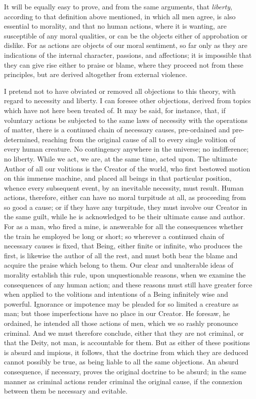 \documentclass[]{article}
\begin{document}
\begin{sectionbody}
\humeparagraph  It will be equally easy to prove, and from the same arguments, that \emph{liberty}, according to that definition above mentioned, in which all men agree, is also essential to morality, and that no human actions, where it is wanting, are susceptible of any moral qualities, or can be the objects either of approbation or dislike. For as actions are objects of our moral sentiment, so far only as they are indications of the internal character, passions, and affections; it is impossible that they can give rise either to praise or blame, where they proceed not from these principles, but are derived altogether from external violence.

\humeparagraph  I pretend not to have obviated or removed all objections to this theory, with regard to necessity and liberty. I can foresee other objections, derived from topics which have not here been treated of. It may be said, for instance, that, if voluntary actions be subjected to the same laws of necessity with the operations of matter, there is a continued chain of necessary causes, pre-ordained and pre-determined, reaching from the original cause of all to every single volition of every human creature. No contingency anywhere in the universe; no indifference; no liberty. While we act, we are, at the same time, acted upon. The ultimate Author of all our volitions is the Creator of the world, who first bestowed motion on this immense machine, and placed all beings in that particular position, whence every subsequent event, by an inevitable necessity, must result. Human actions, therefore, either can have no moral turpitude at all, as proceeding from so good a cause; or if they have any turpitude, they must involve our Creator in the same guilt, while he is acknowledged to be their ultimate cause and author. For as a man, who fired a mine, is answerable for all the consequences whether the train he employed be long or short; so wherever a continued chain of necessary causes is fixed, that Being, either finite or infinite, who produces the first, is likewise the author of all the rest, and must both bear the blame and acquire the praise which belong to them. Our clear and unalterable ideas of morality establish this rule, upon unquestionable reasons, when we examine the consequences of any human action; and these reasons must still have greater force when applied to the volitions and intentions of a Being infinitely wise and powerful. Ignorance or impotence may be pleaded for so limited a creature as man; but those imperfections have no place in our Creator. He foresaw, he ordained, he intended all those actions of men, which we so rashly pronounce criminal. And we must therefore conclude, either that they are not criminal, or that the Deity, not man, is accountable for them. But as either of these positions is absurd and impious, it follows, that the doctrine from which they are deduced cannot possibly be true, as being liable to all the same objections. An absurd consequence, if necessary, proves the original doctrine to be absurd; in the same manner as criminal actions render criminal the original cause, if the connexion between them be necessary and evitable.


\end{sectionbody}
\end{document}
